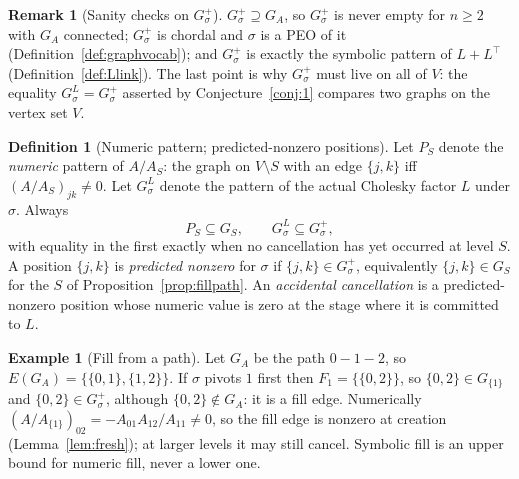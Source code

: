 \documentclass[11pt]{article}
\theoremstyle{plain}
\theoremstyle{definition}
\newtheorem{definition}[theorem]{Definition}
\newtheorem{example}[theorem]{Example}
\newtheorem{remark}[theorem]{Remark}
\begin{document}
\begin{humanblock}
\begin{remark}[Sanity checks on $G^+_\sigma$]\label{rem:fill-sanity}
$G^+_\sigma\supseteq G_A$, so $G^+_\sigma$ is never empty for $n\ge2$ with $G_A$ connected;
$G^+_\sigma$ is chordal and $\sigma$ is a PEO of it (Definition~\ref{def:graphvocab}); and
$G^+_\sigma$ is exactly the symbolic pattern of $L+L^\top$ (Definition~\ref{def:Llink}). The last
point is why $G^+_\sigma$ must live on all of $V$: the equality $G^L_\sigma=G^+_\sigma$ asserted by
Conjecture~\ref{conj:1} compares two graphs on the vertex set $V$.
\end{remark}

\begin{definition}[Numeric pattern; predicted-nonzero positions]\label{def:numeric}
Let $P_S$ denote the \emph{numeric} pattern of $A/A_S$: the graph on $V\setminus S$ with an edge
$\{j,k\}$ iff $(A/A_S)_{jk}\neq0$. Let $G^L_\sigma$ denote the pattern of the actual Cholesky factor
$L$ under $\sigma$. Always
\[
P_S\subseteq G_S,\qquad G^L_\sigma\subseteq G^+_\sigma,
\]
with equality in the first exactly when no cancellation has yet occurred at level $S$. A position
$\{j,k\}$ is \emph{predicted nonzero} for $\sigma$ if $\{j,k\}\in G^+_\sigma$, equivalently
$\{j,k\}\in G_S$ for the $S$ of Proposition~\ref{prop:fillpath}. An \emph{accidental cancellation} is
a predicted-nonzero position whose numeric value is zero at the stage where it is committed to $L$.
\end{definition}

\begin{example}[Fill from a path]\label{ex:fill-path}
Let $G_A$ be the path $0-1-2$, so $E(G_A)=\{\{0,1\},\{1,2\}\}$. If $\sigma$ pivots $1$ first then
$F_1=\{\{0,2\}\}$, so $\{0,2\}\in G_{\{1\}}$ and $\{0,2\}\in G^+_\sigma$, although
$\{0,2\}\notin G_A$: it is a fill edge. Numerically
$(A/A_{\{1\}})_{02}=-A_{01}A_{12}/A_{11}\neq0$, so the fill edge is nonzero at creation
(Lemma~\ref{lem:fresh}); at larger levels it may still cancel. Symbolic fill is an upper bound for
numeric fill, never a lower one.
\end{example}
\end{humanblock}
\end{document}
